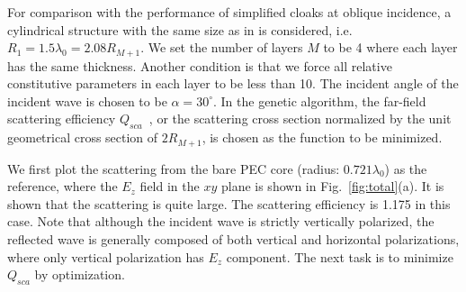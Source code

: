 \documentclass[12pt]{article} %
\begin{document}
For comparison with the performance of simplified cloaks at oblique
incidence, a cylindrical structure with the same size as in
\cite{baile_oe1} is considered, i.e. $R_1 = 1.5 \lambda_0 = 2.08
R_{M+1}$. We set the number of layers $M$ to be 4 where each layer
has the same thickness. Another condition is that we force all
relative constitutive parameters in each layer to be less than 10.
The incident angle of the incident wave is chosen to be $\alpha =
30^{\circ}$. In the genetic algorithm, the far-field scattering
efficiency $Q_{sca}$~\cite{baileprb}, or the scattering cross
section normalized by the unit geometrical cross section of
$2R_{M+1}$, is chosen as the function to be minimized.

We first plot the scattering from the bare PEC core (radius: $0.721
\lambda_0$) as the reference, where the $E_z$ field in the $xy$
plane is shown in Fig.~\ref{fig:total}(a).
 It is shown that the scattering is quite large. The
scattering efficiency is 1.175 in this case. Note that although the
incident wave is strictly vertically polarized, the reflected wave
is generally composed of both vertical and horizontal polarizations,
where only vertical polarization has $E_z$ component. The next task
is to minimize $Q_{sca}$ by optimization.
\end{document}
